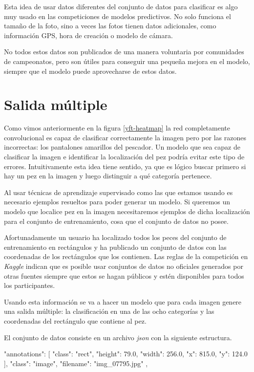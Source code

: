 Esta idea de usar datos diferentes del conjunto de datos para clasificar es algo muy usado en las competiciones de modelos predictivos. No solo funciona el tamaño de la foto, sino a veces las fotos tienen datos adicionales, como información GPS, hora de creación o modelo de cámara.

No todos estos datos son publicados de una manera voluntaria por comunidades de campeonatos, pero son útiles para conseguir una pequeña mejora en el modelo, siempre que el modelo puede aprovecharse de estos datos.

\section{Salida múltiple}

Como vimos anteriormente en la figura \ref{yft-heatmap} la red completamente
convolucional es capaz de clasificar correctamente la imagen pero por las
razones incorrectas: los pantalones amarillos del pescador. Un modelo que sea
capaz de clasificar la imagen e identificar la localización del pez podría
evitar este tipo de errores. Intuitivamente esta idea tiene sentido, ya que es lógico
buscar primero si hay un pez en la imagen y luego distinguir a qué categoría
pertenece.

Al usar técnicas de aprendizaje supervisado como las que estamos usando es
necesario ejemplos resueltos para poder generar un modelo. Si queremos un modelo
que localice pez en la imagen necesitaremos ejemplos de dicha
localización para el conjunto de entrenamiento, cosa que el conjunto de datos no posee.

Afortunadamente un usuario ha localizado todos los peces del conjunto de
entrenamiento en rectángulos y ha publicado un conjunto de datos con las
coordenadas de los rectángulos que los contienen. Las reglas de la competición
en \textit{Kaggle} indican que es posible usar conjuntos de datos no oficiales
generados por otras fuentes siempre que estos se hagan públicos y estén
disponibles para todos los participantes.

Usando esta información se va a hacer un modelo que para cada imagen genere una
salida múltiple: la clasificación en una de las ocho categorías y las
coordenadas del rectángulo que contiene al pez.

El conjunto de datos consiste en un archivo \textit{json} con la siguiente estructura.

\begin{python}
{
    "annotations": [
        {
            "class": "rect",
            "height": 79.0,
            "width": 256.0,
            "x": 815.0,
            "y": 124.0
        }
    ],
    "class": "image",
    "filename": "img_07795.jpg"
},
\end{python}

